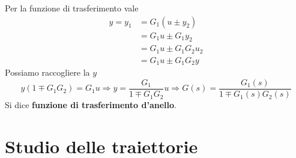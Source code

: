 \documentclass[10pt,a4paper]{book}
\begin{document}
Per la funzione di trasferimento vale
\begin{equation*}
	\begin{aligned}
		y=y_1 & =G_1\left(u\pm y_2\right) \\
		      & =G_1 u\pm G_1 y_2         \\
		      & =G_1 u\pm G_1 G_2 u_2     \\
		      & =G_1 u\pm G_1 G_2 y       
	\end{aligned}
\end{equation*}
Possiamo raccogliere la $y$
\begin{equation*}
	y\left(1\mp G_1 G_2\right) =G_1 u\Rightarrow y=\frac{G_1}{1\mp G_1 G_2} u\Rightarrow \boxed{G\left(s\right) =\frac{G_1\left(s\right)}{1\mp G_1\left(s\right) G_2\left(s\right)}}
\end{equation*}
Si dice \textbf{funzione di trasferimento d'anello}.
\chapter{Studio delle traiettorie}
\end{document}
